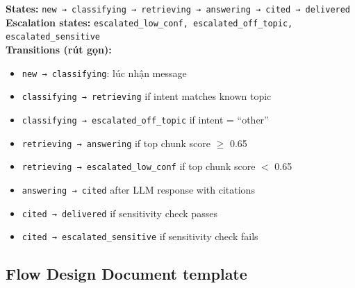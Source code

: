 \documentclass[11pt,a4paper]{article}
\begin{document}
\begin{tpl}[title=State machine — Admissions Q\&A]
\textbf{States:} \texttt{new → classifying → retrieving → answering → cited → delivered}\\
\textbf{Escalation states:} \texttt{escalated\_low\_conf, escalated\_off\_topic, escalated\_sensitive}\\[4pt]
\textbf{Transitions (rút gọn):}
\begin{itemize}
\item \texttt{new → classifying}: lúc nhận message
\item \texttt{classifying → retrieving} if intent matches known topic
\item \texttt{classifying → escalated\_off\_topic} if intent = ``other''
\item \texttt{retrieving → answering} if top chunk score $\geq$ 0.65
\item \texttt{retrieving → escalated\_low\_conf} if top chunk score $<$ 0.65
\item \texttt{answering → cited} after LLM response with citations
\item \texttt{cited → delivered} if sensitivity check passes
\item \texttt{cited → escalated\_sensitive} if sensitivity check fails
\end{itemize}
\end{tpl}

\subsection{Flow Design Document template}
\end{document}
